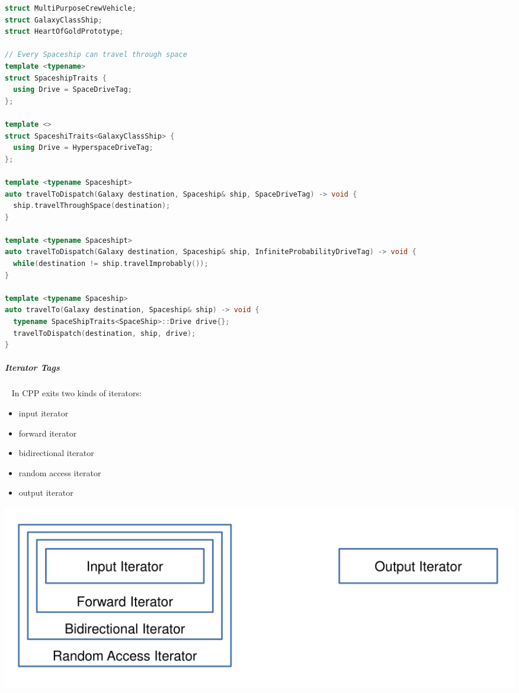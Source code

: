 \documentclass[11pt,twoside,landscape]{article}
\begin{document}
\begin{multicols}{2}
\begin{lstlisting}[language=c++,label=lst:tag-for-dispatching-example,caption={Tag for dispatching example},captionpos=b,numbers=none]
struct MultiPurposeCrewVehicle;
struct GalaxyClassShip;
struct HeartOfGoldPrototype;

// Every Spaceship can travel through space
template <typename>
struct SpaceshipTraits {
  using Drive = SpaceDriveTag;
};

template <>
struct SpaceshiTraits<GalaxyClassShip> {
  using Drive = HyperspaceDriveTag;
};

template <typename Spaceshipt>
auto travelToDispatch(Galaxy destination, Spaceship& ship, SpaceDriveTag) -> void {
  ship.travelThroughSpace(destination);
}

template <typename Spaceshipt>
auto travelToDispatch(Galaxy destination, Spaceship& ship, InfiniteProbabilityDriveTag) -> void {
  while(destination != ship.travelImprobably());
}

template <typename Spaceship>
auto travelTo(Galaxy destination, Spaceship& ship) -> void {
  typename SpaceShipTraits<SpaceShip>::Drive drive{};
  travelToDispatch(destination, ship, drive);
}
\end{lstlisting}

\subparagraph{Iterator Tags} \
\label{sec:org53a6d49}
In CPP exits two kinds of iterators:
\begin{itemize}
\item input iterator
\item forward iterator
\item bidirectional iterator
\item random access iterator
\item output iterator
\end{itemize}


{
\begin{center}
\includegraphics[width=.9\linewidth]{img/stl_iterator_categories.png}
\end{center}
\label{fig:stl-iterator-categories}
}


\end{multicols}
\end{document}
